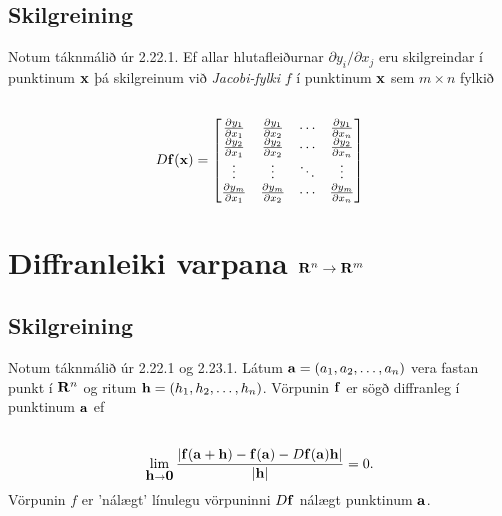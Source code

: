 \documentclass[a4paper,10pt,icelandic]{sphinxmanual}
\begin{document}
\subsection{Skilgreining}
\label{Kafli2:id38}\label{Kafli2:index-19}
Notum táknmálið úr 2.22.1. Ef allar hlutafleiðurnar \(\partial
y_i/\partial x_j\) eru skilgreindar í punktinum \(\mbox{${\bf x}$}\)
þá skilgreinum við \emph{Jacobi-fylki} \(f\) í punktinum
\(\mbox{${\bf x}$}\) sem \(m\times n\) fylkið
\begin{gather}
\begin{split}\displaystyle\end{split}\notag\\\begin{split}D\mbox{${\bf f}$}(\mbox{${\bf x}$})=\begin{bmatrix}
\frac{\partial y_1}{\partial x_1}&\frac{\partial y_1}{\partial x_2}&
\cdots&\frac{\partial y_1}{\partial x_n}\\
\frac{\partial y_2}{\partial x_1}&\frac{\partial y_2}{\partial x_2}&
\cdots&\frac{\partial y_2}{\partial x_n}\\
\vdots&\vdots&\ddots&\vdots\\
\frac{\partial y_m}{\partial x_1}&\frac{\partial y_m}{\partial x_2}&
\cdots&\frac{\partial y_m}{\partial x_n}
\end{bmatrix}\end{split}\notag
\end{gather}

\section{Diffranleiki varpana \(\mbox{${\bf R}^n$}\rightarrow\mbox{${\bf R}^m$}\)}
\label{Kafli2:diffranleiki-varpana}\label{Kafli2:index-20}

\subsection{Skilgreining}
\label{Kafli2:id39}
Notum táknmálið úr 2.22.1 og 2.23.1. Látum
\(\mbox{${\bf a}$}=(a_1, a_2, \ldots, a_n)\) vera fastan punkt í
\(\mbox{${\bf R}^n$}\) og ritum
\(\mbox{${\bf h}$}=(h_1,h_2,\ldots,h_n)\). Vörpunin
\(\mbox{${\bf f}$}\) er sögð diffranleg í punktinum
\(\mbox{${\bf a}$}\) ef
\begin{gather}
\begin{split}\displaystyle\end{split}\notag\\\begin{split}\lim_{\mbox{${\bf h}$}\rightarrow
  \mbox{${\bf 0}$}}\frac{|\mbox{${\bf f}$}(\mbox{${\bf a}$}+\mbox{${\bf h}$})-\mbox{${\bf f}$}(\mbox{${\bf a}$})-D\mbox{${\bf f}$}(\mbox{${\bf a}$})\mbox{${\bf h}$}|}{|\mbox{${\bf h}$}|}=0.\end{split}\notag
\end{gather}
Vörpunin \(f\) er ’nálægt’ línulegu vörpuninni
\(D\mbox{${\bf f}$}\) nálægt punktinum \(\mbox{${\bf a}$}\).
\end{document}
